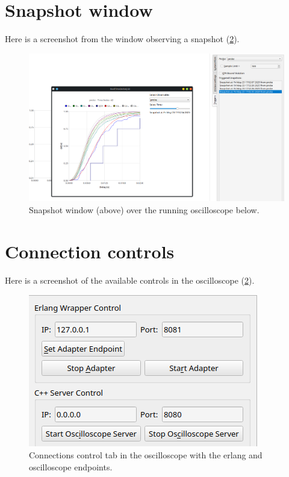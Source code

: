 \section{Snapshot window} \label{app:snapshot}
    Here is a screenshot from the window observing a snapshot (\cref{fig:control_tab}).

    \begin{figure}[H]
        \begin{center}
            \includegraphics[width = \textwidth]{img/slow_g.png}
        \end{center}
        \caption{Snapshot window (above) over the running oscilloscope below.}
        \label{fig:control_tab} 
    \end{figure}


\section{Connection controls} \label{app:con_control}
    Here is a screenshot of the available controls in the oscilloscope (\cref{fig:control_tab}).
   
   \begin{figure}[H]
        \begin{center}
            \includegraphics[width = \textwidth]{img/manual/server.png}
        \end{center}
        \caption{Connections control tab in the oscilloscope with the erlang and oscilloscope endpoints.}
        \label{fig:control_tab}
    \end{figure}

